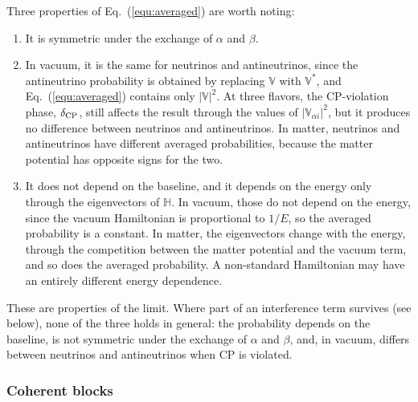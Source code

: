 \documentclass[final,5p,times,twocolumn,sort,compress]{elsarticle}
\makeatletter
\newcommand{\eq}{Eq.}
\DeclareRobustCommand{\_}{%
  \ifmmode\nfss@text{\textunderscore}\else\textunderscore\allowbreak\fi}
\newcommand{\equ}[1]{\eq~(\ref{equ:#1})}
\makeatother
\begin{document}
Three properties of \equ{averaged} are worth noting:
\begin{enumerate}
\item It is symmetric under the exchange of $\alpha$ and $\beta$.
\item In vacuum, it is the same for neutrinos and antineutrinos, since the antineutrino probability is obtained by replacing $\mathbb{V}$ with $\mathbb{V}^\ast$, and \equ{averaged} contains only $\lvert \mathbb{V} \rvert^2$. At three flavors, the CP-violation phase, $\delta_{\rm CP}$, still affects the result through the values of $\lvert \mathbb{V}_{\alpha i} \rvert^2$, but it produces no difference between neutrinos and antineutrinos. In matter, neutrinos and antineutrinos have different averaged probabilities, because the matter potential has opposite signs for the two.
\item It does not depend on the baseline, and it depends on the energy only through the eigenvectors of $\mathbb{H}$. In vacuum, those do not depend on the energy, since the vacuum Hamiltonian is proportional to $1/E$, so the averaged probability is a constant. In matter, the eigenvectors change with the energy, through the competition between the matter potential and the vacuum term, and so does the averaged probability. A non-standard Hamiltonian may have an entirely different energy dependence.
\end{enumerate}
These are properties of the limit. Where part of an interference term survives (see below), none of the three holds in general: the probability depends on the baseline, is not symmetric under the exchange of $\alpha$ and $\beta$, and, in vacuum, differs between neutrinos and antineutrinos when CP is violated.


\subsubsection{Coherent blocks}
\end{document}
